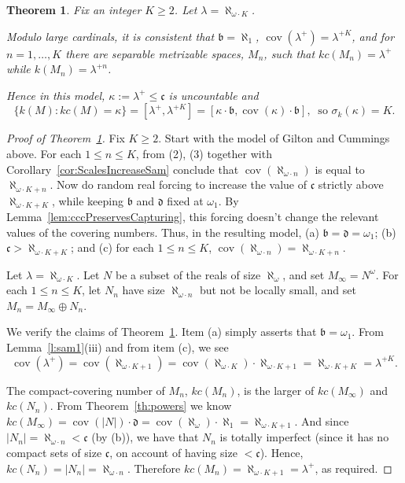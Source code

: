 \documentclass[10pt,a4paper]{amsart}
\newtheorem{thm}{Theorem}
\begin{document}
\begin{thm}\label{th:K_many}
Fix an integer $K\ge 2$. 
Let $\lambda=\aleph_{\omega\cdot K}$. 

Modulo large cardinals, it is consistent that $\mathfrak{b}=\aleph_1$, 
$\mathop{cov}(\lambda^+)=\lambda^{+K}$, and  
for $n=1,\ldots,K$ there are separable metrizable spaces, $M_n$, such that $kc(M_n)=\lambda^+$ while $k(M_n)=\lambda^{+n}$.

Hence in this model, $\kappa:=\lambda^+ \le \mathfrak{c}$ is uncountable and
\[\{k(M):kc(M)=\kappa\}=
[\lambda^+,\lambda^{+K}]=
[\kappa\cdot\mathfrak{b},\mathop{cov}(\kappa)\cdot\mathfrak{b}], \ \text{  so }\sigma_k(\kappa)=K.\] 
\end{thm}

\begin{proof}[Proof of  Theorem~\ref{th:K_many}]
Fix $K\ge 2$. 
Start with the model of Gilton and Cummings above. For each $1\leq n\leq K$, from (2), (3) together with Corollary~\ref{cor:ScalesIncreaseSam}   conclude that 
 $\mathop{cov}(\aleph_{\omega\cdot n})$ is equal to $\aleph_{\omega\cdot K+n}$. 
    Now do random real forcing to increase the value of $\mathfrak{c}$ strictly above $\aleph_{\omega\cdot K+K}$, while keeping $\mathfrak{b}$ and $\mathfrak{d}$ fixed at $\omega_1$. By Lemma~\ref{lem:cccPreservesCapturing}, this forcing doesn't change the relevant values of the covering numbers. 
Thus, in the resulting model, (a) $\mathfrak{b}=\mathfrak{d}=\omega_1$;
    (b) $\mathfrak{c}>\aleph_{\omega\cdot K+K}$; and
    (c) for each $1\leq n\leq K$, $\mathop{cov}(\aleph_{\omega\cdot n})=\aleph_{\omega\cdot K+n}$.

Let $\lambda=\aleph_{\omega\cdot K}$. 
Let $N$ be a subset of the reals of size $\aleph_\omega$, and set $M_\infty=N^\omega$. For each $1\le n \le K$, let $N_n$ have size $\aleph_{\omega\cdot n}$  but not be locally small, and set $M_n = M_\infty \oplus N_n$. 

We verify the claims of Theorem~\ref{th:K_many}. Item (a) simply asserts that $\mathfrak{b}=\omega_1$.
From Lemma~\ref{l:sam1}(iii) and from item (c), we see 
\[
\mathop{cov}(\lambda^+)=\mathop{cov}(\aleph_{\omega\cdot K+1})=\mathop{cov}(\aleph_{\omega\cdot K})\cdot \aleph_{\omega\cdot K+1}=\aleph_{\omega\cdot K+K}=\lambda^{+K}.
\]


The compact-covering number of $M_n$, $kc(M_n)$, is the larger of $kc(M_\infty)$ and $kc(N_n)$. 
From Theorem~\ref{th:powers} we know $kc(M_\infty)=\mathop{cov}(|N|)\cdot\mathfrak{d}=\mathop{cov}(\aleph_\omega)\cdot\aleph_1=\aleph_{\omega\cdot K+1}$. 
And since $|N_n|=\aleph_{\omega\cdot n} < \mathfrak{c}$ (by (b)), we have that $N_n$ is totally imperfect (since it has no compact sets of size $\mathfrak{c}$, on account of having size $<\mathfrak{c}$). Hence, 
$kc(N_n)=|N_n|=\aleph_{\omega\cdot n}$. 
Therefore $kc(M_n)=\aleph_{\omega\cdot K+1}=\lambda^+$, as required.


\end{proof}
\end{document}
